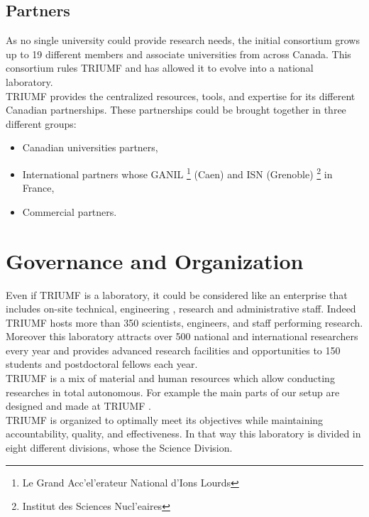 \documentclass[a4paper, 11pt]{report}%
\newcommand{\TR}{TRIUMF }
\begin{document}
  \subsection{Partners}
  As no single university could provide research needs, the initial consortium grows up to 19 different 
  members and associate universities from across Canada. This consortium rules \TR and has allowed it to evolve into a national 
  laboratory.  
  \\
  
  \TR provides the centralized resources, tools, and expertise for its different Canadian partnerships. These partnerships could be 
  brought together in three different groups: 
  \begin{itemize}
  \item Canadian universities partners,  
  \item International partners whose GANIL \footnote[1]{Le Grand Acc'el'erateur National d'Ions Lourds} (Caen) and ISN (Grenoble) \footnote[1]{Institut des Sciences Nucl'eaires} in France,   
  \item Commercial partners. 
  \end{itemize}
  
  \section{Governance and Organization}
  
  Even if \TR is a laboratory, it could be considered like an enterprise that includes on-site technical, engineering , research and 
  administrative staff. Indeed \TR hosts more than 350 scientists, engineers, and staff performing research. Moreover this laboratory attracts over 
  500 national and international researchers every year and provides advanced research facilities and opportunities to 150 students and 
  postdoctoral fellows each year.
  \\
  
  \TR is a mix of material and human resources which allow conducting researches in total autonomous. For example the main parts of 
  our setup are designed and made at \TR. 
  \\
    
  \TR is organized to optimally meet its objectives while maintaining accountability, quality, and effectiveness. In that way this 
  laboratory is divided in eight different divisions, whose the Science Division. 
  \\
  
\end{document}

